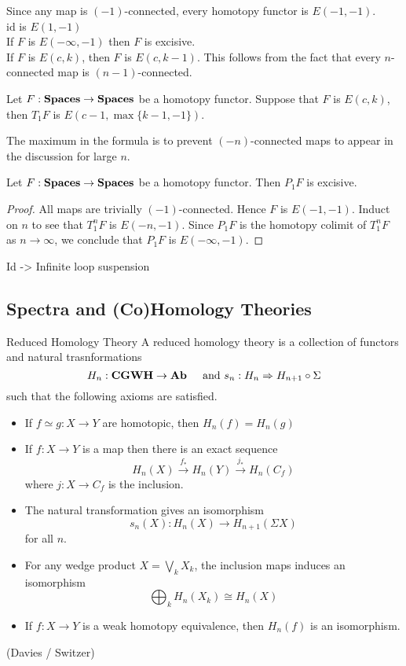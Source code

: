 \documentclass[a4paper]{article}
\begin{document}
Since any map is $(-1)$-connected, every homotopy functor is $E(-1,-1)$. \\
$\text{id}$ is $E(1,-1)$\\
If $F$ is $E(-\infty,-1)$ then $F$ is excisive. \\
If $F$ is $E(c,k)$, then $F$ is $E(c,k-1)$. This follows from the fact that every $n$-connected map is $(n-1)$-connected. 

\begin{prp}{}{} Let $F:\bold{Spaces}\to\bold{Spaces}$ be a homotopy functor. Suppose that $F$ is $E(c,k)$, then $T_1F$ is $E(c-1,\max\{k-1,-1\})$. 
\end{prp}

The maximum in the formula is to prevent $(-n)$-connected maps to appear in the discussion for large $n$. 

\begin{thm}{}{} Let $F:\bold{Spaces}\to\bold{Spaces}$ be a homotopy functor. Then $P_1F$ is excisive. \tcbline
\begin{proof}
All maps are trivially $(-1)$-connected. Hence $F$ is $E(-1,-1)$. Induct on $n$ to see that $T_1^nF$ is $E(-n,-1)$. Since $P_1F$ is the homotopy colimit of $T_1^nF$ as $n\to\infty$, we conclude that $P_1F$ is $E(-\infty,-1)$. 
\end{proof}
\end{thm}

\begin{eg}{}{} Id -> Infinite loop suspension
\end{eg}

\subsection{Spectra and (Co)Homology Theories}
\begin{defn}{Reduced Homology Theory}{} A reduced homology theory is a collection of functors and natural trasnformations $$H_n:\bold{CGWH}\to\bold{Ab}\;\;\;\;\text{ and }s_n:H_n\Rightarrow H_{n+1}\circ\Sigma$$ such that the following axioms are satisfied. 
\begin{itemize}
\item If $f\simeq g:X\to Y$ are homotopic, then $H_n(f)=H_n(g)$
\item If $f:X\to Y$ is a map then there is an exact sequence $$H_n(X)\overset{f_\ast}{\rightarrow}H_n(Y)\overset{j_\ast}{\rightarrow}H_n(C_f)$$ where $j:X\to C_f$ is the inclusion. 
\item The natural transformation gives an isomorphism $$s_n(X):H_n(X)\to H_{n+1}(\Sigma X)$$ for all $n$. 
\item For any wedge product $X=\bigvee_k X_k$, the inclusion maps induces an isomorphism $$\bigoplus_k H_n(X_k)\cong H_n(X)$$
\item If $f:X\to Y$ is a weak homotopy equivalence, then $H_n(f)$ is an isomorphism. 
\end{itemize}
\end{defn} (Davies / Switzer)
\end{document}
